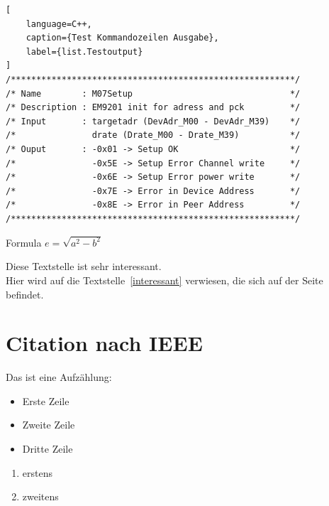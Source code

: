 \begin{lstlisting}[
    language=C++,
    caption={Test Kommandozeilen Ausgabe},
    label={list.Testoutput}
]
/********************************************************/
/* Name        : M07Setup                               */
/* Description : EM9201 init for adress and pck         */
/* Input       : targetadr (DevAdr_M00 - DevAdr_M39)    */
/*               drate (Drate_M00 - Drate_M39)          */
/* Ouput       : -0x01 -> Setup OK                      */
/*               -0x5E -> Setup Error Channel write     */
/*               -0x6E -> Setup Error power write       */
/*               -0x7E -> Error in Device Address       */
/*               -0x8E -> Error in Peer Address         */
/********************************************************/
\end{lstlisting}

Formula $e = \sqrt{a{^2} - b^{2}}$


Diese Textstelle ist sehr interessant.\label{interessant}\\
Hier wird auf die Textstelle~\ref{interessant} verwiesen, die sich auf der Seite~\pageref{interessant} befindet.





\section{Citation nach IEEE}\label{citation}






Das ist eine Aufzählung:
\begin{itemize} %
	\item Erste Zeile
	\item Zweite Zeile
	\item Dritte Zeile
\end{itemize}


\begin{enumerate}
\item erstens
\item zweitens
\end{enumerate}




